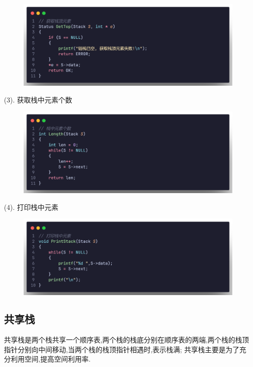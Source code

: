 \begin{figure}[H]
    \centering
    \includegraphics[scale=0.2]{"figure/Note/Stack/SlG.png"}
\end{figure}

(3). 获取栈中元素个数

\begin{figure}[H]
    \centering
    \includegraphics[scale=0.2]{"figure/Note/Stack/SlN.png"}
\end{figure}

(4). 打印栈中元素

\begin{figure}[H]
    \centering
    \includegraphics[scale=0.2]{"figure/Note/Stack/SlPrint.png"}
\end{figure}


\subsection{共享栈}
\begin{definition}[共享栈]
    共享栈是两个栈共享一个顺序表,两个栈的栈底分别在顺序表的两端,两个栈的栈顶指针分别向中间移动,当两个栈的栈顶指针相遇时,表示栈满; 共享栈主要是为了充分利用空间,提高空间利用率.
\end{definition}

